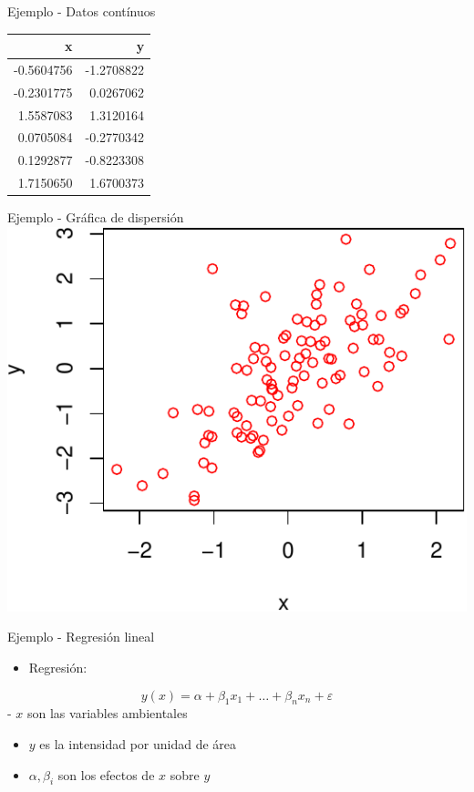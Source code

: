\documentclass[
  11pt,
  ignorenonframetext,
]{beamer}
\providecommand{\tightlist}{%
  \setlength{\itemsep}{0pt}\setlength{\parskip}{0pt}}
\begin{document}
\begin{frame}{Ejemplo - Datos contínuos}
\protect\hypertarget{ejemplo---datos-contuxednuos}{}
\begin{longtable}[]{@{}rr@{}}
\toprule()
x & y \\
\midrule()
\endhead
-0.5604756 & -1.2708822 \\
-0.2301775 & 0.0267062 \\
1.5587083 & 1.3120164 \\
0.0705084 & -0.2770342 \\
0.1292877 & -0.8223308 \\
1.7150650 & 1.6700373 \\
\bottomrule()
\end{longtable}
\end{frame}

\begin{frame}{Ejemplo - Gráfica de dispersión}
\protect\hypertarget{ejemplo---gruxe1fica-de-dispersiuxf3n}{}
\includegraphics{Generalidades_files/figure-beamer/unnamed-chunk-2-1.pdf}
\end{frame}

\begin{frame}{Ejemplo - Regresión lineal}
\protect\hypertarget{ejemplo---regresiuxf3n-lineal}{}
\begin{itemize}
\tightlist
\item
  Regresión:
\end{itemize}

\[ y(x) = \alpha + \beta_1 x_1 + \dots + \beta_n x_n + \varepsilon\] -
\(x\) son las variables ambientales

\begin{itemize}
\item
  \(y\) es la intensidad por unidad de área
\item
  \(\alpha, \beta_i\) son los efectos de \(x\) sobre \(y\)
\end{itemize}
\end{frame}
\end{document}
